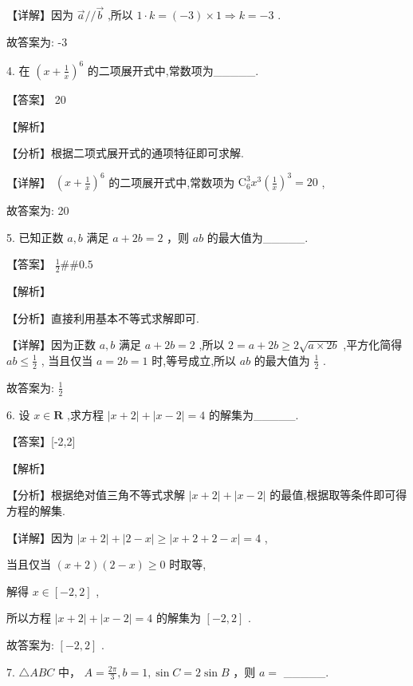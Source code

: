 \documentclass[10pt]{article}
\begin{document}
【详解】因为 \(\overrightarrow{a}//\overrightarrow{b}\) ,所以 \(1 \cdot  k = \left( {-3}\right)  \times  1 \Rightarrow  k =  - 3\) .

故答案为: -3

4. 在 \({\left( x + \frac{1}{x}\right) }^{6}\) 的二项展开式中,常数项为\_\_\_\_\_.

【答案】 20

【解析】

【分析】根据二项式展开式的通项特征即可求解.

【详解】 \({\left( x + \frac{1}{x}\right) }^{6}\) 的二项展开式中,常数项为 \({\mathrm{C}}_{6}^{3}{x}^{3}{\left( \frac{1}{x}\right) }^{3} = {20}\) ,

故答案为: 20

5. 已知正数 \(a,b\) 满足 \(a + {2b} = 2\) ，则 \({ab}\) 的最大值为\_\_\_\_\_.

【答案】 \(\frac{1}{2}\# \# {0.5}\)

【解析】

【分析】直接利用基本不等式求解即可.

【详解】因为正数 \(a,b\) 满足 \(a + {2b} = 2\) ,所以 \(2 = a + {2b} \geq  2\sqrt{a \times  {2b}}\) ,平方化简得 \({ab} \leq  \frac{1}{2}\) , 当且仅当 \(a = {2b} = 1\) 时,等号成立,所以 \({ab}\) 的最大值为 \(\frac{1}{2}\) .

故答案为: \(\frac{1}{2}\)

6. 设 \(x \in  \mathbf{R}\) ,求方程 \(\left| {x + 2}\right|  + \left| {x - 2}\right|  = 4\) 的解集为\_\_\_\_\_.

【答案】[-2,2]

【解析】

【分析】根据绝对值三角不等式求解 \(\left| {x + 2}\right|  + \left| {x - 2}\right|\) 的最值,根据取等条件即可得方程的解集.

【详解】因为 \(\left| {x + 2}\right|  + \left| {2 - x}\right|  \geq  \left| {x + 2 + 2 - x}\right|  = 4\) ,

当且仅当 \(\left( {x + 2}\right) \left( {2 - x}\right)  \geq  0\) 时取等,

解得 \(x \in  \left\lbrack  {-2,2}\right\rbrack\) ,

所以方程 \(\left| {x + 2}\right|  + \left| {x - 2}\right|  = 4\) 的解集为 \(\left\lbrack  {-2,2}\right\rbrack\) .

故答案为: \(\left\lbrack  {-2,2}\right\rbrack\) .

7. \(\bigtriangleup  {ABC}\) 中， \(A = \frac{2\pi }{3},b = 1,\sin C = 2\sin B\) ，则 \(a =\) \_\_\_\_\_.
\end{document}
